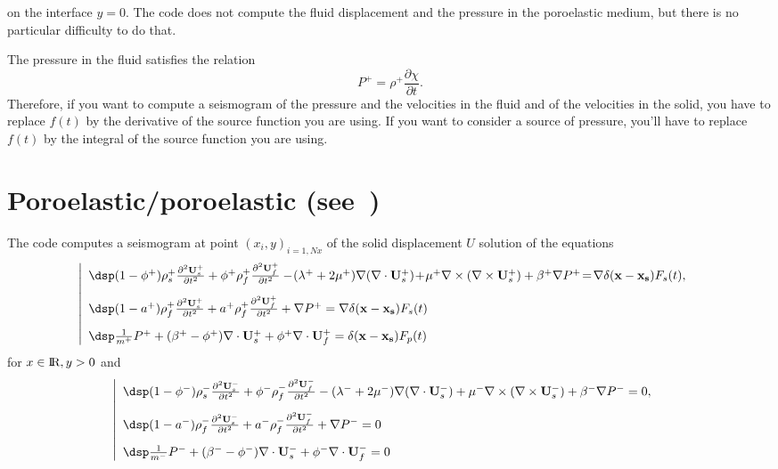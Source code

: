 \documentclass[11pt,a4]{article}
\begin{document}
on the interface $y=0$.
The code
does not compute the fluid displacement and the
pressure in the poroelastic medium, but there is
no particular difficulty to do that. 
\begin{Remark}
  The pressure in the fluid satisfies the relation
  $$P^+=\rho^+\frac{\partial \chi}{\partial t}.$$
  Therefore, if you want to compute a seismogram
  of the pressure  and the velocities in the fluid
  and of the velocities in the solid, you have to
  replace $f(t)$ by the derivative of the source
  function you are using. If you want to consider
  a source of pressure, you'll have to
  replace $f(t)$ by the integral of the source
  function you are using.
\end{Remark}
\section{Poroelastic/poroelastic (see~\cite{Rap3})}
The code computes a seismogram at point
$(x_i,y)_{i=1,Nx}$ of the solid displacement $U$
solution of the equations
$$ \begin{array}{lr}
\!\!\!\!\left|
  \begin{array}{l}
\dsp  (1-\phi^+)\rho_s^+ \derp {^2
  \mathbf U_s^+}{t^2}+\phi^+\rho_f^+\derp {^2
  \mathbf U_f^+}{t^2}-\!(\lambda^++2\mu^+) \nabla (\nabla \cdot
\mathbf U_s^+)\!+\!\mu^+\nabla\times(\nabla \times \mathbf U_s^+)+\beta^+\nabla P^+\!=\!\nabla\delta({\mathbf x}-\mathbf{x_s}) F_s(t)
,\\[10pt]
    \dsp  (1-a^+)\rho_f^+ \derp {^2
  \mathbf U_s^+}{t^2}+a^+\rho_f^+\derp {^2
  \mathbf U_f^+}{t^2}+\nabla P^+=\nabla\delta({\mathbf x}-\mathbf{x_s}) F_s(t)\\[10pt]
\dsp \frac 1 {m^+} P^+ +(\beta^+-\phi^+) \nabla
\cdot \mathbf U_s^++ \phi^+ \nabla \cdot \mathbf U_f^+=\delta({\mathbf x}-\mathbf{x_s}) F_p(t)
  \end{array}
\right. 
\end{array}$$
for $x\in\hbox{I}\!\hbox{R}, y>0$ and
$$ \begin{array}{lr}
\!\!\!\!\left|
  \begin{array}{l}
\dsp  (1-\phi^-)\rho_s^- \derp {^2
  \mathbf U_s^-}{t^2}+\phi^-\rho_f^-\derp {^2
  \mathbf U_f^-}{t^2}-(\lambda^-+2\mu^-) \nabla (\nabla \cdot
\mathbf U_s^-)+\mu^-\nabla\times(\nabla \times \mathbf U_s^-)+\beta^-\nabla P^-=0
,\\[10pt]
    \dsp  (1-a^-)\rho_f^- \derp {^2
  \mathbf U_s^-}{t^2}+a^-\rho_f^-\derp {^2
  \mathbf U_f^-}{t^2}+\nabla P^-=0\\[10pt]
\dsp \frac 1 {m^-} P^- +(\beta^--\phi^-) \nabla
\cdot \mathbf U_s^-+ \phi^- \nabla \cdot \mathbf U_f^-=0
  \end{array}
\right. 
\end{array}$$
\end{document}
